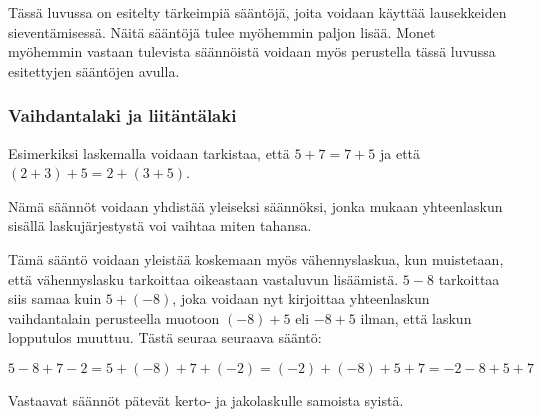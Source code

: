 Tässä luvussa on esitelty tärkeimpiä sääntöjä, joita voidaan käyttää lausekkeiden sieventämisessä. Näitä sääntöjä tulee myöhemmin paljon lisää. Monet myöhemmin vastaan tulevista säännöistä voidaan myös perustella tässä luvussa esitettyjen sääntöjen avulla.

\subsubsection*{Vaihdantalaki ja liitäntälaki}


Esimerkiksi laskemalla voidaan tarkistaa, että $5+7=7+5$ ja että $(2+3)+5=2+(3+5)$.

Nämä säännöt voidaan yhdistää yleiseksi säännöksi, jonka mukaan yhteenlaskun sisällä laskujärjestystä voi vaihtaa miten tahansa.

Tämä sääntö voidaan yleistää koskemaan myös vähennyslaskua, kun muistetaan, että vähennyslasku tarkoittaa oikeastaan vastaluvun lisäämistä. $5-8$ tarkoittaa siis samaa kuin $5+(-8)$, joka voidaan nyt kirjoittaa yhteenlaskun vaihdantalain perusteella muotoon $(-8)+5$ eli $-8+5$ ilman, että laskun lopputulos muuttuu. Tästä seuraa seuraava sääntö:


\begin{esimerkki}
$5-8+7-2=5+(-8)+7+(-2)=(-2)+(-8)+5+7=-2-8+5+7$
\end{esimerkki}

Vastaavat säännöt pätevät kerto- ja jakolaskulle samoista syistä.



